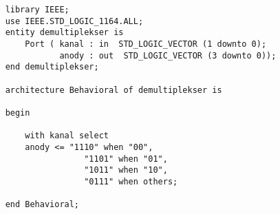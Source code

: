 \begin{lstlisting}
    library IEEE;
    use IEEE.STD_LOGIC_1164.ALL;
    entity demultiplekser is
        Port ( kanal : in  STD_LOGIC_VECTOR (1 downto 0);
               anody : out  STD_LOGIC_VECTOR (3 downto 0));
    end demultiplekser;
    
    architecture Behavioral of demultiplekser is
    
    begin
    
        with kanal select
        anody <= "1110" when "00",
                    "1101" when "01",
                    "1011" when "10",
                    "0111" when others;
    
    end Behavioral;
\end{lstlisting}
